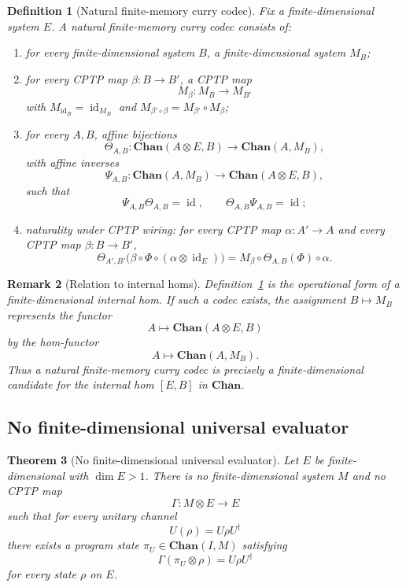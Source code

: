 \documentclass[11pt]{article}
\newtheorem{theorem}{Theorem}[section]
\newtheorem{definition}[theorem]{Definition}
\newtheorem{remark}[theorem]{Remark}
\DeclareMathOperator{\id}{id}
\begin{document}
\begin{definition}[Natural finite-memory curry codec]
\label{def:natural-codec}
Fix a finite-dimensional system $E$. A
\emph{natural finite-memory curry codec} consists of:
\begin{enumerate}
\item for every finite-dimensional system $B$, a finite-dimensional system
$M_B$;
\item for every CPTP map $\beta:B\to B'$, a CPTP map
\[
M_\beta:M_B\longrightarrow M_{B'}
\]
with $M_{\id_B}=\id_{M_B}$ and
$M_{\beta'\circ\beta}=M_{\beta'}\circ M_\beta$;
\item for every $A,B$, affine bijections
\[
\Theta_{A,B}:
\mathbf{Chan}(A\otimes E,B)
\longrightarrow
\mathbf{Chan}(A,M_B),
\]
with affine inverses
\[
\Psi_{A,B}:
\mathbf{Chan}(A,M_B)
\longrightarrow
\mathbf{Chan}(A\otimes E,B),
\]
such that
\[
\Psi_{A,B}\Theta_{A,B}=\id,
\qquad
\Theta_{A,B}\Psi_{A,B}=\id;
\]
\item naturality under CPTP wiring: for every CPTP map
$\alpha:A'\to A$ and every CPTP map $\beta:B\to B'$,
\[
\Theta_{A',B'}
\bigl(
\beta\circ\Phi\circ(\alpha\otimes\id_E)
\bigr)
=
M_\beta
\circ
\Theta_{A,B}(\Phi)
\circ
\alpha.
\]
\end{enumerate}
\end{definition}

\begin{remark}[Relation to internal homs]
Definition~\ref{def:natural-codec} is the operational form of a
finite-dimensional internal hom. If such a codec exists, the assignment
$B\mapsto M_B$ represents the functor
\[
A\longmapsto \mathbf{Chan}(A\otimes E,B)
\]
by the hom-functor
\[
A\longmapsto \mathbf{Chan}(A,M_B).
\]
Thus a natural finite-memory curry codec is precisely a finite-dimensional
candidate for the internal hom $[E,B]$ in $\mathbf{Chan}$.
\end{remark}

\subsection{No finite-dimensional universal evaluator}

\begin{theorem}[No finite-dimensional universal evaluator]
\label{thm:no-universal-evaluator}
Let $E$ be finite-dimensional with $\dim E>1$. There is no finite-dimensional
system $M$ and no CPTP map
\[
\Gamma:M\otimes E\longrightarrow E
\]
such that for every unitary channel
\[
U(\rho)=U\rho U^\dagger
\]
there exists a program state $\pi_U\in\mathbf{Chan}(I,M)$ satisfying
\[
\Gamma(\pi_U\otimes\rho)=U\rho U^\dagger
\]
for every state $\rho$ on $E$.
\end{theorem}
\end{document}
